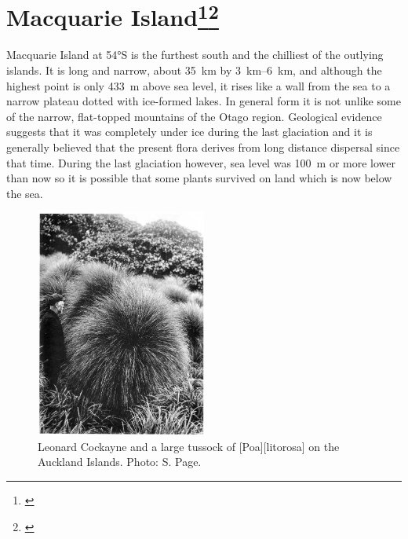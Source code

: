 \section[Macquarie Island]{Macquarie Island\thinspace\footnote{\cite{taylor1955flora}}\footnote{\cite{seppelt1984vascular}}}

Macquarie Island at \ang{54}S is the furthest south and the chilliest of the outlying islands.
It is long and narrow, about \SI{35}{\kilo\metre} by \SIrange{3}{6}{\kilo\metre}, and although the highest point is only \SI{433}{\metre} above sea level, it rises like a wall from the sea to a narrow plateau dotted with ice-formed lakes.
In general form it is not unlike some of the narrow, flat-topped mountains of the Otago region.
Geological evidence suggests that it was completely under ice during the last glaciation and it is generally believed that the present flora derives from long distance dispersal since that time.
During the last glaciation however, sea level was \SI{100}{\metre} or more lower than now so it is possible that some plants survived on land which is now below the sea.

\begin{figure}
	\includegraphics[width=0.5\textwidth]{graphics/figure115cockayne.jpg}
	\centering
	\caption[Leonard Cockayne and a large tussock]{Leonard Cockayne and a large tussock of [Poa][litorosa] on the Auckland Islands.
	Photo: S. Page.}%
	\label{fig:115cockayne}
\end{figure}

